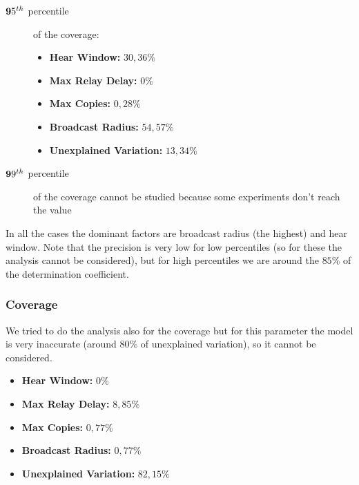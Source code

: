 \begin{description}
	\item [$\textbf 95^{th}$ percentile] of the coverage:
		\begin{itemize}
			\item \textbf{Hear Window:} \(30,36\%\)
			\item \textbf{Max Relay Delay:} \(0\%\)
			\item \textbf{Max Copies:} \(0,28\%\)
			\item \textbf{Broadcast Radius:} \(54,57\%\)
			\item \textbf{Unexplained Variation:} \(13,34\%\)
		\end{itemize}
	\item [$\textbf 99^{th}$ percentile] of the coverage cannot be studied
		because some experiments don't reach the value
\end{description}

In all the cases the dominant factors are broadcast radius (the highest) and
hear window. Note that the precision is very low for low percentiles (so for
these the analysis cannot be considered), but for high percentiles we are around
the \(85\%\) of the determination coefficient.

\subsubsection{Coverage}

We tried to do the analysis also for the coverage but for this parameter the
model is very inaccurate (around \(80\%\) of unexplained variation), so it
cannot be considered.

\begin{itemize}
	\item \textbf{Hear Window:} \(0\%\)
	\item \textbf{Max Relay Delay:} \(8,85\%\)
	\item \textbf{Max Copies:} \(0,77\%\)
	\item \textbf{Broadcast Radius:} \(0,77\%\)
	\item \textbf{Unexplained Variation:} \(82,15\%\)
\end{itemize}
